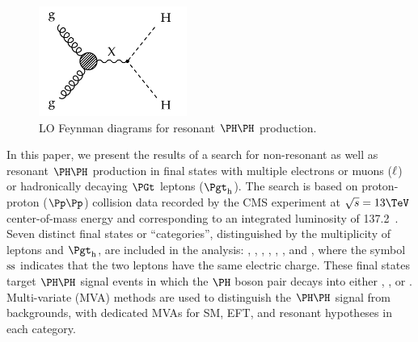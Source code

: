 \begin{figure}[h!]
\setlength{\unitlength}{1mm}
\begin{center}
\includegraphics*[height=36mm]{figures/ggHH_resonant.pdf}
\end{center}
\caption{
  LO Feynman diagrams for resonant $\HH$ production.
}
\label{fig:Feynman_ggHH_resonant}
\end{figure}

In this paper, we present the results of a search for non-resonant as well as resonant $\HH$ production
in final states with multiple electrons or muons ($\Plepton$) or hadronically decaying $\PGt$ leptons ($\tauh$).
The search is based on proton-proton ($\Pp\Pp$) collision data recorded by the CMS experiment at $\sqrt{s} = 13\TeV$ center-of-mass energy
and corresponding to an integrated luminosity of 137.2~\fbinv.
Seven distinct final states or ``categories'', distinguished by the multiplicity of leptons and $\tauh$, are included in the analysis:
\twoLeptonssZeroTau, \threeLeptonZeroTau, \fourLeptonZeroTau, \threeLeptonOneTau, \twoLeptonTwoTau, \oneLeptonThreeTau, and \zeroLeptonFourTau,
where the symbol $\ss$ indicates that the two leptons have the same electric charge. 
These final states target $\HH$ signal events in which the $\PHiggs$ boson pair decays into either \WWWW, \WWtt, or \tttt.
Multi-variate (MVA) methods are used to distinguish the $\HH$ signal from backgrounds,
with dedicated MVAs for SM, EFT, and resonant hypotheses in each category.

